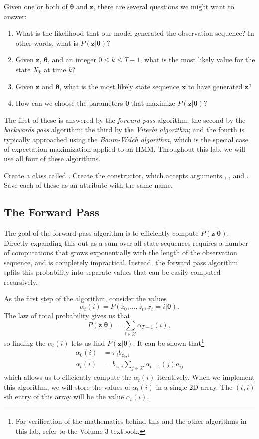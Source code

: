 Given one or both of $\boldsymbol\theta$ and $\mathbf{z}$, there are several questions we might want to answer:
\begin{enumerate}
 \item What is the likelihood that our model generated the observation sequence? In other words, what is $P(\boldsymbol z | \boldsymbol\theta)$?
 \item Given $\boldsymbol z$, $\boldsymbol\theta$, and an integer $0\leq k \leq T-1$, what is the most likely value for the state $X_k$ at time $k$?
 \item Given $\boldsymbol z$ and $\boldsymbol\theta$, what is the most likely state sequence $\boldsymbol x$ to have generated $\boldsymbol z$?
 \item How can we choose the parameters $\boldsymbol\theta$ that maximize $P(\boldsymbol z | \boldsymbol\theta)$?
\end{enumerate}
The first of these is answered by the \emph{forward pass} algorithm; the second by the \emph{backwards pass} algorithm; the third by the \emph{Viterbi algorithm}; and the fourth is typically approached using the \emph{Baum-Welch algorithm}, which is the special case of expectation maximization applied to an HMM.
Throughout this lab, we will use all four of these algorithms.

\begin{problem}
Create a class called .
Create the constructor, which accepts arguments , , and .
Save each of these as an attribute with the same name.
\end{problem}

\subsection*{The Forward Pass}
The goal of the forward pass algorithm is to efficiently compute $P(\boldsymbol z | \boldsymbol\theta)$.
Directly expanding this out as a sum over all state sequences requires a number of computations that grows exponentially with the length of the observation sequence, and is completely impractical.
Instead, the forward pass algorithm splits this probability into separate values that can be easily computed recursively.

As the first step of the algorithm, consider the values
\[
\alpha_t(i)=P(z_0, \ldots, z_t, x_t=i | \boldsymbol\theta).
\]
The law of total probability gives us that
\[
P(\boldsymbol z | \boldsymbol\theta) = \sum_{i \in \mathscr{X}} \alpha_{T-1}(i),
\]
so finding the $\alpha_t(i)$ lets us find $P(\boldsymbol z | \boldsymbol\theta)$.
It can be shown that\footnote{For verification of the mathematics behind this and the other algorithms in this lab, refer to the Volume 3 textbook.}
\begin{align*}
\alpha_0(i) &= \pi_i b_{z_0,i} \\
\alpha_{t}(i) &= b_{z_t,i} \sum_{j\in \mathscr{X}} \alpha_{t-1}(j)a_{ij}
\end{align*}
which allows us to efficiently compute the $\alpha_t(i)$ iteratively.
When we implement this algorithm, we will store the values of $\alpha_t(i)$ in a single 2D array.
The $(t,i)$-th entry of this array will be the value $\alpha_t(i)$.

